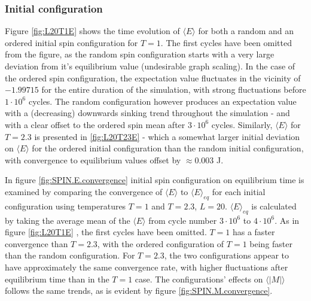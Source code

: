 \documentclass[%
oneside,                 %
final,                   %
10pt]{article}
\begin{document}
\subsubsection*{Initial configuration}
Figure \ref{fig:L20T1E} shows the time evolution of $\langle E \rangle$ for both a random and an ordered initial spin configuration for $T=1$. The first cycles have been omitted from the figure, as the random spin configuration starts with a very large deviation from it's equilibrium value (undesirable graph scaling). In the case of the ordered spin configuration, the expectation value fluctuates in the vicinity of $-1.99715$ for the entire duration of the simulation, with strong fluctuations before $1 \cdot 10^6$ cycles. The random configuration however produces an expectation value with a (decreasing) downwards sinking trend throughout the simulation - and with a clear offset to the ordered spin mean after $3 \cdot 10^6$ cycles. Similarly, $\langle E \rangle$ for $T=2.3$ is presented in  \ref{fig:L20T23E} - which a somewhat larger initial deviation on $\langle E \rangle$ for the ordered initial configuration than the random initial configuration, with convergence to equilibrium values offset by $\approx 0.003$ J.   \newline

In figure \ref{fig:SPIN.E.convergence} initial spin configuration on equilibrium time is examined by comparing the convergence of $\langle E \rangle$ to $\langle E \rangle_{eq}$ for each initial configuration using temperatures $T=1$ and $T=2.3$, $L=20$.  $\langle E \rangle_{eq}$ is calculated by taking the average mean of the $\langle E \rangle$ from cycle number $3\cdot 10^6$ to $4\cdot 10^6$.  As in figure \ref{fig:L20T1E} , the first cycles have been omitted. $T=1$ has a faster convergence than $T=2.3$, with the ordered configuration of $T=1$ being faster than the random configuration. For $T=2.3$, the two configurations appear to have approximately the same convergence rate, with higher fluctuations after equilibrium time than in the $T=1$ case. The configurations' effects on $\langle |M| \rangle$ follows the same trends, as is evident by figure \ref{fig:SPIN.M.convergence}. \newline
\end{document}
